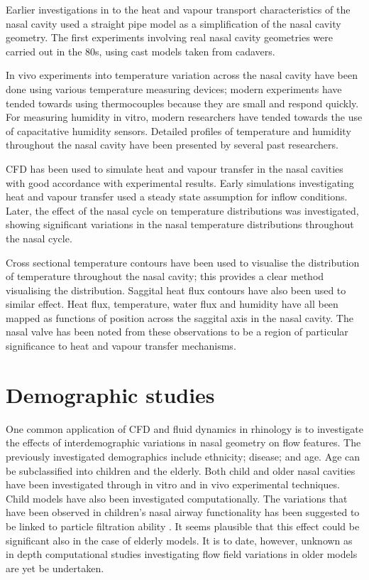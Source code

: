 Earlier investigations in to the heat and vapour transport characteristics of the nasal cavity used a straight pipe model as a simplification of the nasal cavity geometry\cite{Ingelstedt1961}. The first experiments involving real nasal cavity geometries were carried out in the 80s, using cast models taken from cadavers\cite{Nuckols1983}.

In vivo experiments into temperature variation across the nasal cavity have been done using various temperature measuring devices; modern experiments have tended towards using thermocouples because they are small and respond quickly\cite{Elad2008}. For measuring humidity in vitro, modern researchers have tended towards the use of capacitative humidity sensors\cite{Keck2000}. Detailed profiles of temperature and humidity throughout the nasal cavity have been presented by several past researchers\cite{Keck2000}.

CFD has been used to simulate heat and vapour transfer in the nasal cavities with good accordance with experimental results\cite{Lindemann2004}. Early simulations investigating heat and vapour transfer used a steady state assumption for inflow conditions\cite{Naftali1998}. Later, the effect of the nasal cycle on temperature distributions was investigated, showing significant variations in the nasal temperature distributions throughout the nasal cycle\cite{Elad2006}.

Cross sectional temperature contours have been used to visualise the distribution of temperature throughout the nasal cavity; this provides a clear method visualising the distribution\cite{Naftali2005}. Saggital heat flux contours have also been used to similar effect\cite{Sullivan2013}. Heat flux, temperature, water flux and humidity have all been mapped as functions of position across the saggital axis in the nasal cavity\cite{Garcia2007, Sullivan2013, Yu2014}. The nasal valve has been noted from these observations to be a region of particular significance to heat and vapour transfer mechanisms\cite{Sullivan2013}. 

\section{Demographic studies}
One common application of CFD and fluid dynamics in rhinology is to investigate the effects of interdemographic variations in nasal geometry on flow features. The previously investigated demographics include ethnicity\cite{Zhu2011}; disease\cite{Garcia2007}; and  age\cite{Xi2012}. Age can be subclassified into children\cite{Xi2012} and the elderly\cite{Lindemann2008}. Both child and older nasal cavities have been investigated through in vitro\cite{Weinhold2004} and in vivo\cite{Kalmovich2005, Edelstein1996, WhanKim2007, Lindemann2008} experimental techniques. Child models have also been investigated computationally\cite{Xi2012}. The variations that have been observed in children's nasal airway functionality has been suggested to be linked to particle filtration ability \cite{Xi2012}. It seems plausible that this effect could be significant also in the case of elderly models. It is to date, however, unknown as in depth computational studies investigating flow field variations in older models are yet be undertaken.


